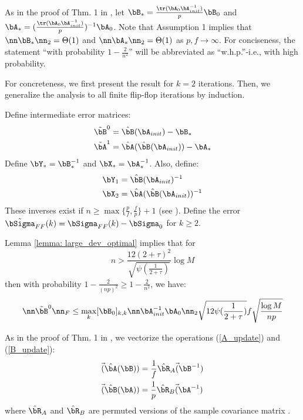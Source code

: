 \begin{IEEEproof}
As in the proof of Thm. 1 in \cite{EstCovMatKron}, let $\bB_* = \frac{\tr(\bA_0\bA_{init}^{-1})}{p} \bB_0$ and $\bA_* = (\frac{\tr(\bA_0\bA_{init}^{-1})}{p})^{-1} \bA_0$. Note that Assumption 1 implies that $\nn \bB_* \nn_2 = \Theta(1)$ and $\nn \bA_* \nn_2=\Theta(1)$ as $p,f\to\infty$. For conciseness, the statement ``with probability $1-\frac{2}{n^2}$'' will be abbreviated as ``w.h.p.''-i.e., with high probability.

For concreteness, we first present the result for $k=2$ iterations. Then, we generalize the analysis to all finite flip-flop iterations by induction.

Define intermediate error matrices:
\begin{align*}
	\tilde{\bB}^0 &= \hat{\bB}(\bA_{init}) - \bB_* \\
	\tilde{\bA}^1 &= \hat{\bA}(\hat{\bB}(\bA_{init})) - \bA_*
\end{align*}
Define $\bY_*=\bB_*^{-1}$ and $\bX_*=\bA_*^{-1}$. Also, define:
\begin{align*}
	\bY_1 &= \hat{\bB}(\bA_{init})^{-1} \\
	\bX_2 &= \hat{\bA}(\hat{\bB}(\bA_{init}))^{-1}
\end{align*}
These inverses exist if $n\geq \max\{\frac{p}{f},\frac{f}{p}\} + 1$ (see \cite{LuZimmerman}). Define the error $\tilde{\bSigma}_{FF}(k)=\bSigma_{FF}(k) - \bSigma_0$ for $k \geq 2$.


Lemma \ref{lemma: large_dev_optimal} implies that for
\begin{equation} \label{cond_0}
	n> \frac{12(2+\tau)^2}{\sqrt{\psi(\frac{1}{2+\tau})}} \log M
\end{equation}
then with probability $1-\frac{2}{(np)^2} \geq 1 - \frac{2}{n^2}$, we have:
\begin{equation} \label{B_0_Frob1}
	\nn \tilde{\bB}^0 \nn_F \leq \max_k [\bB_0]_{k,k} \nn\bA_{init}^{-1}\bA_0\nn_2 \sqrt{12\psi(\frac{1}{2+\tau})} f \sqrt{ \frac{\log M}{np}}
\end{equation}

As in the proof of Thm. 1 in \cite{EstCovMatKron}, we vectorize the operations (\ref{A_update}) and (\ref{B_update}):
\begin{align*}
	\vec(\hat{\bA}(\bB)) &= \frac{1}{f} \hat{\bR}_A \vec(\bB^{-1}) \\
	\vec(\hat{\bB}(\bA)) &= \frac{1}{p} \hat{\bR}_B \vec(\bA^{-1})
\end{align*}
where $\hat{\bR}_A$ and $\hat{\bR}_B$ are permuted versions of the sample covariance matrix \cite{EstCovMatKron}.


\end{IEEEproof}
